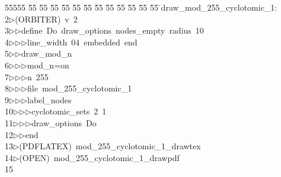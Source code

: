 %
%
\begin{tabbing}
55555 \= 55 \= 55 \= 55 \= 55 \= 55 \= 55 \= 55 \= 55 \= 55 \= 55 \= 55 \= 55 \= \>draw\_mod\_255\_cyclotomic\_1:\\[0pt]
2\>$\triangleright$\>(ORBITER)\ v\ 2\ \\[0pt]
3\>$\triangleright$\>$\triangleright$\>define\ Do\ draw\_options\ nodes\_empty\ radius\ 10\ \\[0pt]
4\>$\triangleright$\>$\triangleright$\>$\triangleright$\>line\_width\ 04\ embedded\ end\ \\[0pt]
5\>$\triangleright$\>$\triangleright$\>draw\_mod\_n\ \\[0pt]
6\>$\triangleright$\>$\triangleright$\>$\triangleright$\>mod\_n=on\ \\[0pt]
7\>$\triangleright$\>$\triangleright$\>$\triangleright$\>n\ 255\ \\[0pt]
8\>$\triangleright$\>$\triangleright$\>$\triangleright$\>file\ mod\_255\_cyclotomic\_1\ \\[0pt]
9\>$\triangleright$\>$\triangleright$\>$\triangleright$\>label\_nodes\ \\[0pt]
10\>$\triangleright$\>$\triangleright$\>$\triangleright$\>cyclotomic\_sets\ 2\ 1\ \\[0pt]
11\>$\triangleright$\>$\triangleright$\>$\triangleright$\>draw\_options\ Do\ \\[0pt]
12\>$\triangleright$\>$\triangleright$\>end\\[0pt]
13\>$\triangleright$\>(PDFLATEX)\ mod\_255\_cyclotomic\_1\_drawtex\\[0pt]
14\>$\triangleright$\>(OPEN)\ mod\_255\_cyclotomic\_1\_drawpdf\\[0pt]
15\>\end{tabbing}
